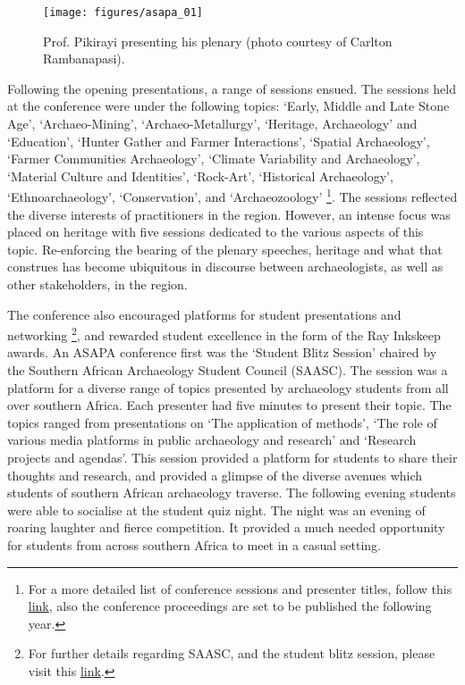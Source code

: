 \begin{figure}
			\texttt{[image: figures/asapa\_01]}%
			\caption{Prof. Pikirayi presenting his plenary (photo courtesy of Carlton Rambanapasi).}
			\label{asapa_01} %
		\end{figure}
	
	Following the opening presentations, a range of sessions ensued. The sessions held at the conference were under the following topics: ‘Early, Middle and Late Stone Age’, ‘Archaeo-Mining’, ‘Archaeo-Metallurgy’, ‘Heritage, Archaeology’ and ‘Education’, ‘Hunter Gather and Farmer Interactions’, ‘Spatial Archaeology’, ‘Farmer Communities Archaeology’, ‘Climate Variability and Archaeology’, ‘Material Culture and Identities’, ‘Rock-Art’, ‘Historical Archaeology’, ‘Ethnoarchaeology’, ‘Conservation’, and ‘Archaeozoology’
	\footnote{For a more detailed list of conference sessions and presenter titles, follow this 
		\href{http://www.asapa2015.uz.ac.zw/index.php/conference/programme}{link}, also the conference proceedings are set to be published the following year.}. The sessions reflected the diverse interests of practitioners in the region. However, an intense focus was placed on heritage with five sessions dedicated to the various aspects of this topic. Re-enforcing the bearing of the plenary speeches, heritage and what that construes has become ubiquitous in discourse between archaeologists, as well as other stakeholders, in the region.
	
	The conference also encouraged platforms for student presentations and networking
	\footnote{For further details regarding SAASC, and the student blitz session, please visit this \href{http://saasc.co.za/index.php/2015/07/21/asapa-2015-student-blitz-session/}{link}.}, and rewarded student excellence in the form of the Ray Inkskeep awards. 
An ASAPA conference first was the ‘Student Blitz Session’ chaired by the Southern African Archaeology Student Council (SAASC). 
The session was a platform for a diverse range of topics presented by archaeology students from all over southern Africa. Each presenter had five minutes to present their topic. The topics ranged from presentations on ‘The application of methods’, ‘The role of various media platforms in public archaeology and research’ and ‘Research projects and agendas’. This session provided a platform for students to share their thoughts and research, and provided a glimpse of the diverse avenues which students of southern African archaeology traverse. 
The following evening students were able to socialise at the student quiz night. 
The night was an evening of roaring laughter and fierce competition. It provided a much needed opportunity for students from across southern Africa to meet in a casual setting. 
		
